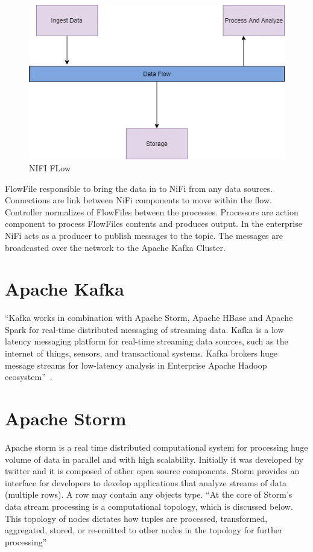 \begin{figure}[!ht]
\centering\includegraphics[width=\columnwidth]{images/NiFi.jpg}
  \caption{NIFI FLow}\label{f:nifi}
\end{figure}
 

FlowFile responsible to bring the data in to NiFi from any data sources. 
Connections are link between NiFi components to move within the flow. 
Controller normalizes of FlowFiles between the processes.  Processors are 
action component to process FlowFiles contents and produces output. 
In the enterprise NiFi acts as a producer to publish messages to the topic. 
The messages are broadcasted over the network to the Apache Kafka Cluster.
 
 
\section{Apache Kafka}

``Kafka works in combination with Apache Storm, Apache HBase and
Apache Spark for real-time distributed messaging of streaming data.
Kafka is a low latency messaging platform for real-time streaming data
sources, such as the internet of things, sensors, and transactional
systems. Kafka brokers huge message streams for low-latency analysis
in Enterprise Apache Hadoop ecosystem''~\cite{hid-sp18-514-hwp}.
 
\section{Apache Storm}

Apache storm is a real time distributed computational system for
processing huge volume of data in parallel and with high
scalability. Initially it was developed by twitter and it is composed
of other open source components.  Storm provides an interface for
developers to develop applications that analyze streams of data
(multiple rows).  A row may contain any objects type.  ``At the core
of Storm's data stream processing is a computational topology, which
is discussed below.  This topology of nodes dictates how tuples are
processed, transformed, aggregated, stored, or re-emitted to other
nodes in the topology for further processing''~\cite{hid-sp18-514-hwp}

